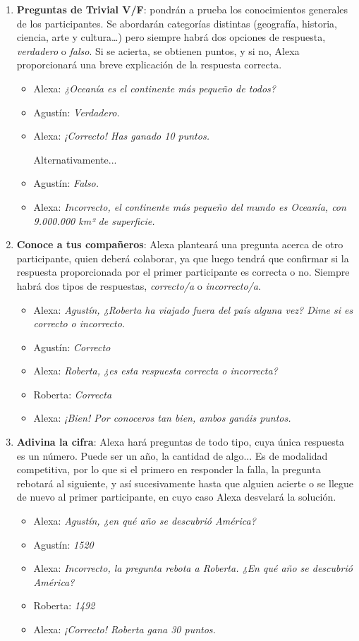 \begin{enumerate}
	\item \textbf{Preguntas de Trivial V/F}: pondrán a prueba los conocimientos generales de los participantes. Se abordarán categorías distintas (geografía, historia, ciencia, arte y cultura…) pero siempre habrá dos opciones de respuesta, \textit{verdadero} o \textit{falso}. Si se acierta, se obtienen puntos, y si no, Alexa proporcionará una breve explicación de la respuesta correcta.
	\begin{itemize}
		\item Alexa: \textit{¿Oceanía es el continente más pequeño de todos?}
		\item Agustín: \textit{Verdadero.}
		\item Alexa: \textit{¡Correcto! Has ganado 10 puntos.}
		
		Alternativamente...
		\item Agustín: \textit{Falso.}
		\item Alexa: \textit{Incorrecto, el continente más pequeño del mundo es Oceanía, con 9.000.000 km² de superficie.}
	\end{itemize}
	
	\item \textbf{Conoce a tus compañeros}: Alexa planteará una pregunta acerca de otro participante, quien deberá colaborar, ya que luego tendrá que confirmar si la respuesta proporcionada por el primer participante es correcta o no. Siempre habrá dos tipos de respuestas, \textit{correcto/a} o \textit{incorrecto/a}.
	\begin{itemize}
		\item Alexa: \textit{Agustín, ¿Roberta ha viajado fuera del país alguna vez? Dime si es correcto o incorrecto.}
		\item Agustín: \textit{Correcto}
		\item Alexa: \textit{Roberta, ¿es esta respuesta correcta o incorrecta?}
		\item Roberta: \textit{Correcta}
		\item Alexa: \textit{¡Bien! Por conoceros tan bien, ambos ganáis puntos.}
	\end{itemize}
	
	\item \textbf{Adivina la cifra}: Alexa hará preguntas de todo tipo, cuya única respuesta es un número. Puede ser un año, la cantidad de algo... Es de modalidad competitiva, por lo que si el primero en responder la falla, la pregunta rebotará al siguiente, y así sucesivamente hasta que alguien acierte o se llegue de nuevo al primer participante, en cuyo caso Alexa desvelará la solución.
	\begin{itemize}
		\item Alexa: \textit{Agustín, ¿en qué año se descubrió América?}
		\item Agustín: \textit{1520}
		\item Alexa: \textit{Incorrecto, la pregunta rebota a Roberta. ¿En qué año se descubrió América?}
		\item Roberta: \textit{1492}
		\item Alexa: \textit{¡Correcto! Roberta gana 30 puntos.}
	\end{itemize}
	

\end{enumerate}
